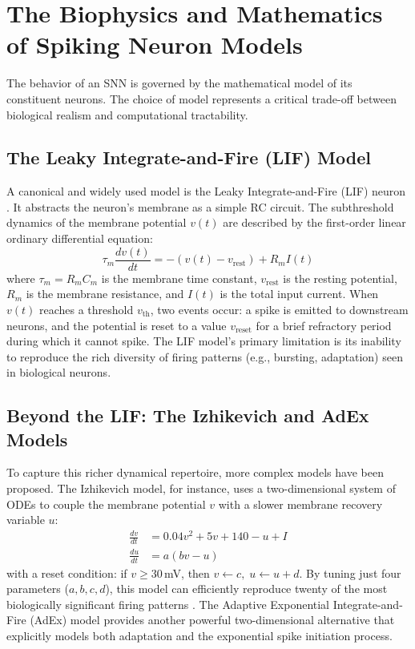 \section{The Biophysics and Mathematics of Spiking Neuron Models}
\label{sec:neuron_models}
The behavior of an SNN is governed by the mathematical model of its constituent neurons. The choice of model represents a critical trade-off between biological realism and computational tractability.

\subsection{The Leaky Integrate-and-Fire (LIF) Model}
A canonical and widely used model is the Leaky Integrate-and-Fire (LIF) neuron \cite{gerstner_spiking_2002}. It abstracts the neuron's membrane as a simple RC circuit. The subthreshold dynamics of the membrane potential $v(t)$ are described by the first-order linear ordinary differential equation:
\begin{equation}
    \tau_m \frac{dv(t)}{dt} = -(v(t) - v_{\text{rest}}) + R_m I(t)
    \label{eq:lif_continuous}
\end{equation}
where $\tau_m = R_m C_m$ is the membrane time constant, $v_{\text{rest}}$ is the resting potential, $R_m$ is the membrane resistance, and $I(t)$ is the total input current. When $v(t)$ reaches a threshold $v_{\text{th}}$, two events occur: a spike is emitted to downstream neurons, and the potential is reset to a value $v_{\text{reset}}$ for a brief refractory period during which it cannot spike. The LIF model's primary limitation is its inability to reproduce the rich diversity of firing patterns (e.g., bursting, adaptation) seen in biological neurons.

\subsection{Beyond the LIF: The Izhikevich and AdEx Models}
To capture this richer dynamical repertoire, more complex models have been proposed. The Izhikevich model, for instance, uses a two-dimensional system of ODEs to couple the membrane potential $v$ with a slower membrane recovery variable $u$:
\begin{align}
    \frac{dv}{dt} &= 0.04v^2 + 5v + 140 - u + I \\
    \frac{du}{dt} &= a(bv - u)
\end{align}
with a reset condition: if $v \ge 30$\,mV, then $v \leftarrow c,\; u \leftarrow u+d$. By tuning just four parameters ($a, b, c, d$), this model can efficiently reproduce twenty of the most biologically significant firing patterns \cite{izhikevich_simple_2003}. The Adaptive Exponential Integrate-and-Fire (AdEx) model provides another powerful two-dimensional alternative that explicitly models both adaptation and the exponential spike initiation process.

